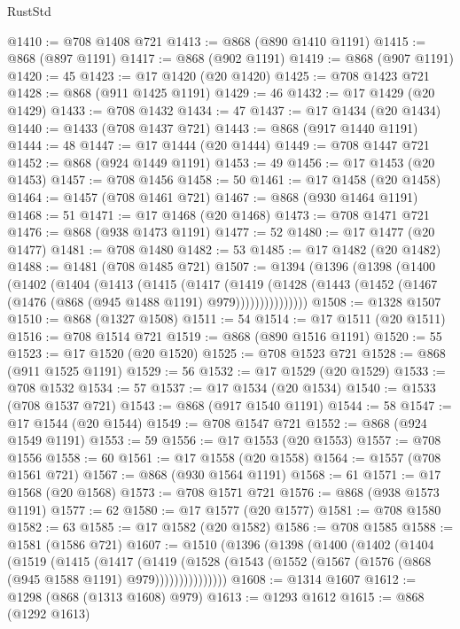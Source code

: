 \begin{lexlean}{RustStd}
\begin{coremodule}
@1410 := @708 @1408 @721
@1413 := @868 (@890 @1410 @1191)
@1415 := @868 (@897 @1191)
@1417 := @868 (@902 @1191)
@1419 := @868 (@907 @1191)
@1420 := 45
@1423 := @17 @1420 (@20 @1420)
@1425 := @708 @1423 @721
@1428 := @868 (@911 @1425 @1191)
@1429 := 46
@1432 := @17 @1429 (@20 @1429)
@1433 := @708 @1432
@1434 := 47
@1437 := @17 @1434 (@20 @1434)
@1440 := @1433 (@708 @1437 @721)
@1443 := @868 (@917 @1440 @1191)
@1444 := 48
@1447 := @17 @1444 (@20 @1444)
@1449 := @708 @1447 @721
@1452 := @868 (@924 @1449 @1191)
@1453 := 49
@1456 := @17 @1453 (@20 @1453)
@1457 := @708 @1456
@1458 := 50
@1461 := @17 @1458 (@20 @1458)
@1464 := @1457 (@708 @1461 @721)
@1467 := @868 (@930 @1464 @1191)
@1468 := 51
@1471 := @17 @1468 (@20 @1468)
@1473 := @708 @1471 @721
@1476 := @868 (@938 @1473 @1191)
@1477 := 52
@1480 := @17 @1477 (@20 @1477)
@1481 := @708 @1480
@1482 := 53
@1485 := @17 @1482 (@20 @1482)
@1488 := @1481 (@708 @1485 @721)
@1507 := @1394
    (@1396
      (@1398
        (@1400
          (@1402
            (@1404
              (@1413
                (@1415
                  (@1417
                    (@1419
                      (@1428
                        (@1443 (@1452 (@1467 (@1476 (@868 (@945 @1488 @1191) @979)))))))))))))))
@1508 := @1328 @1507
@1510 := @868 (@1327 @1508)
@1511 := 54
@1514 := @17 @1511 (@20 @1511)
@1516 := @708 @1514 @721
@1519 := @868 (@890 @1516 @1191)
@1520 := 55
@1523 := @17 @1520 (@20 @1520)
@1525 := @708 @1523 @721
@1528 := @868 (@911 @1525 @1191)
@1529 := 56
@1532 := @17 @1529 (@20 @1529)
@1533 := @708 @1532
@1534 := 57
@1537 := @17 @1534 (@20 @1534)
@1540 := @1533 (@708 @1537 @721)
@1543 := @868 (@917 @1540 @1191)
@1544 := 58
@1547 := @17 @1544 (@20 @1544)
@1549 := @708 @1547 @721
@1552 := @868 (@924 @1549 @1191)
@1553 := 59
@1556 := @17 @1553 (@20 @1553)
@1557 := @708 @1556
@1558 := 60
@1561 := @17 @1558 (@20 @1558)
@1564 := @1557 (@708 @1561 @721)
@1567 := @868 (@930 @1564 @1191)
@1568 := 61
@1571 := @17 @1568 (@20 @1568)
@1573 := @708 @1571 @721
@1576 := @868 (@938 @1573 @1191)
@1577 := 62
@1580 := @17 @1577 (@20 @1577)
@1581 := @708 @1580
@1582 := 63
@1585 := @17 @1582 (@20 @1582)
@1586 := @708 @1585
@1588 := @1581 (@1586 @721)
@1607 := @1510
    (@1396
      (@1398
        (@1400
          (@1402
            (@1404
              (@1519
                (@1415
                  (@1417
                    (@1419
                      (@1528
                        (@1543 (@1552 (@1567 (@1576 (@868 (@945 @1588 @1191) @979)))))))))))))))
@1608 := @1314 @1607
@1612 := @1298 (@868 (@1313 @1608) @979)
@1613 := @1293 @1612
@1615 := @868 (@1292 @1613)

\end{coremodule}
\end{lexlean}
